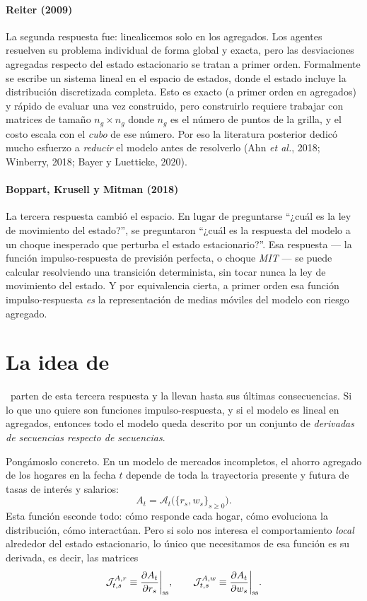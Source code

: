 \paragraph{Reiter (2009)} La segunda respuesta fue: linealicemos solo en los
agregados. Los agentes resuelven su problema individual de forma global y exacta,
pero las desviaciones agregadas respecto del estado estacionario se tratan a
primer orden. Formalmente se escribe un sistema lineal en el espacio de estados,
donde el estado incluye la distribución discretizada completa. Esto es exacto
(a primer orden en agregados) y rápido de evaluar una vez construido, pero
construirlo requiere trabajar con matrices de tamaño $n_g \times n_g$ donde
$n_g$ es el número de puntos de la grilla, y el costo escala con el \emph{cubo}
de ese número. Por eso la literatura posterior dedicó mucho esfuerzo a
\emph{reducir} el modelo antes de resolverlo (Ahn \emph{et al.}, 2018;
Winberry, 2018; Bayer y Luetticke, 2020).

\paragraph{Boppart, Krusell y Mitman (2018)} La tercera respuesta cambió el
espacio. En lugar de preguntarse ``¿cuál es la ley de movimiento del estado?'',
se preguntaron ``¿cuál es la respuesta del modelo a un choque inesperado que
perturba el estado estacionario?''. Esa respuesta --- la función impulso-respuesta
de previsión perfecta, o choque \emph{MIT} --- se puede calcular resolviendo una
transición determinista, sin tocar nunca la ley de movimiento del estado. Y por
equivalencia cierta, a primer orden esa función impulso-respuesta \emph{es} la
representación de medias móviles del modelo con riesgo agregado.

\section{La idea de \ABRS}

\ABRS\ parten de esta tercera respuesta y la llevan hasta sus últimas
consecuencias. Si lo que uno quiere son funciones impulso-respuesta, y si el
modelo es lineal en agregados, entonces todo el modelo queda descrito por un
conjunto de \emph{derivadas de secuencias respecto de secuencias}.

Pongámoslo concreto. En un modelo de mercados incompletos, el ahorro agregado de
los hogares en la fecha $t$ depende de toda la trayectoria presente y futura de
tasas de interés y salarios:
\begin{equation}
A_t = \mathcal{A}_t\big(\{r_s, w_s\}_{s\ge 0}\big).
\end{equation}
Esta función esconde todo: cómo responde cada hogar, cómo evoluciona la
distribución, cómo interactúan. Pero si solo nos interesa el comportamiento
\emph{local} alrededor del estado estacionario, lo único que necesitamos de esa
función es su derivada, es decir, las matrices
\begin{equation}
\mathcal{J}^{A,r}_{t,s} \equiv \frac{\partial A_t}{\partial r_s}\bigg|_{\mathrm{ss}},
\qquad
\mathcal{J}^{A,w}_{t,s} \equiv \frac{\partial A_t}{\partial w_s}\bigg|_{\mathrm{ss}}.
\end{equation}

